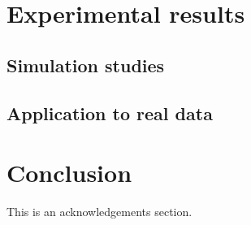 \documentclass[ba]{imsart}
\numberwithin{equation}{section}
\theoremstyle{plain}
\begin{document}
\section{Experimental results}

\subsection{Simulation studies}

\subsection{Application to real data}

\section{Conclusion}

\begin{supplement}
\end{supplement}




\begin{acks}[Acknowledgments]
This is an acknowledgements section.
\end{acks}
\end{document}
